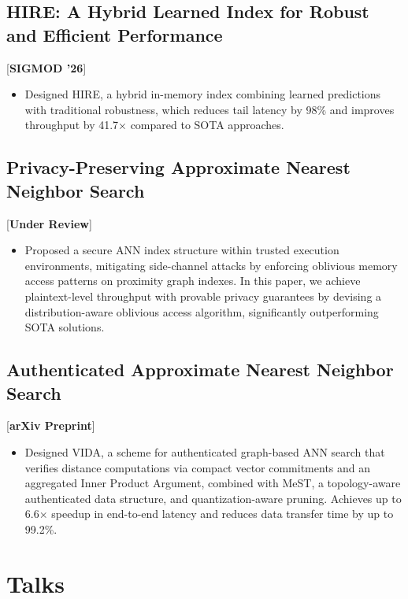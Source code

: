 \documentclass{mycv}
\begin{document}
\vspace{+5pt}

\subsection{HIRE: A Hybrid Learned Index for Robust and Efficient Performance}[\textbf{SIGMOD '26}]
\begin{itemize}
  \item Designed HIRE, a hybrid in-memory index combining learned predictions with traditional robustness, which reduces tail latency by 98\% and improves throughput by 41.7× compared to SOTA approaches.
\end{itemize}

\subsection{Privacy-Preserving Approximate Nearest Neighbor Search}[\textbf{Under Review}]
\begin{itemize}
  \item Proposed a secure ANN index structure within trusted execution environments, mitigating side-channel attacks by enforcing oblivious memory access patterns on proximity graph indexes. In this paper, we achieve plaintext-level throughput with provable privacy guarantees by devising a distribution-aware oblivious access algorithm, significantly outperforming SOTA solutions.
\end{itemize}

\subsection{Authenticated Approximate Nearest Neighbor Search}[\textbf{arXiv Preprint}]
\begin{itemize}
  \item Designed VIDA, a scheme for authenticated graph-based ANN search that verifies distance computations via compact vector commitments and an aggregated Inner Product Argument, combined with MeST, a topology-aware authenticated data structure, and quantization-aware pruning. Achieves up to 6.6$\times$ speedup in end-to-end latency and reduces data transfer time by up to 99.2\%.
\end{itemize}

\section{Talks}
\end{document}
